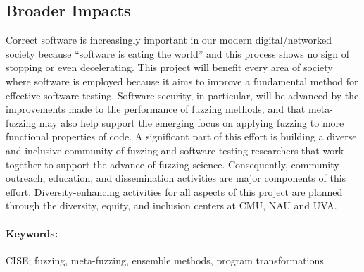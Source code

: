 \subsection*{Broader Impacts}
\vspace{-2mm}
Correct software is increasingly important in our modern digital/networked 
society because ``software is eating the world'' and this process shows no sign 
of stopping or even decelerating. 
This project will benefit every area of society where software is employed because it aims to improve a fundamental method for effective software testing.
Software security, in particular, will be advanced by the 
improvements made to the performance of fuzzing methods, and that meta-fuzzing 
may also help support the emerging focus on applying fuzzing to more functional 
properties of code.
A significant part of this effort is building a diverse and inclusive community of fuzzing and software testing researchers that work together to support the advance of fuzzing science. 
Consequently, community outreach, education, and dissemination activities are major components of this effort.
Diversity-enhancing activities for all aspects of this project are planned through the diversity, equity, and inclusion centers at CMU, NAU and UVA.

\paragraph{Keywords:}
CISE; fuzzing, meta-fuzzing, ensemble methods, program transformations
